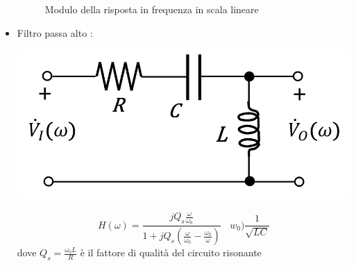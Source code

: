 \documentclass{article}
\theoremstyle{definition}
\begin{document}
\begin{itemize}
\begin{figure}[h]
	\caption{Modulo della risposta in frequenza in scala lineare}
\end{figure}
\item Filtro passa alto : \\
\begin{center}
\includegraphics[scale=0.50]{immagini/paRLC}
\end{center}
$$H(\omega)=\frac{jQ_s\frac{\omega}{\omega_0}}{1+jQ_s\left(\frac{\omega}{\omega_0}-\frac{\omega_0}{\omega}\right) }\ \ \ \ w_0)\frac{1}{\sqrt{LC}}$$
dove $Q_s=\frac{\omega_0 L}{R}$ è il fattore di qualità del circuito risonante


\end{itemize}
\end{document}

